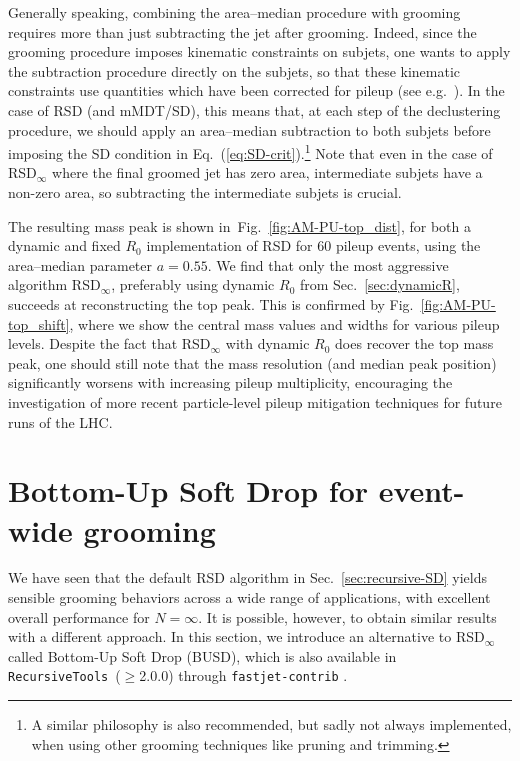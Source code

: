 \documentclass[11pt,a4paper]{article}
\DeclareRobustCommand{\Sec}[1]{Sec.~\ref{#1}}
\DeclareRobustCommand{\Fig}[1]{Fig.~\ref{#1}}
\DeclareRobustCommand{\Eq}[1]{Eq.~(\ref{#1})}
\begin{document}
Generally speaking, combining the area--median procedure with grooming
requires more than just subtracting the jet after grooming.
%
Indeed, since the grooming procedure imposes kinematic constraints on
subjets, one wants to apply the subtraction procedure directly on the
subjets, so that these kinematic constraints use quantities which have
been corrected for pileup (see e.g.~\cite{Altheimer:2013yza}).
%
In the case of RSD (and mMDT/SD), this means that, at each step
of the declustering procedure, we should apply an area--median
subtraction to both subjets before imposing the SD condition in
\Eq{eq:SD-crit}.\footnote{A similar philosophy is also recommended, but sadly not always implemented, when using other grooming techniques like pruning and trimming.}
%
Note that even in the case of RSD$_\infty$ where the final groomed jet
has zero area, intermediate subjets have a non-zero area, so
subtracting the intermediate subjets is crucial. 



The resulting mass peak is shown in~\Fig{fig:AM-PU-top_dist}, for
both a dynamic and fixed $R_0$ implementation of RSD for 60 pileup
events, using the area--median parameter $a=0.55$.
%
We find that only the
most aggressive algorithm RSD$_\infty$, preferably using dynamic
$R_0$ from \Sec{sec:dynamicR}, succeeds at reconstructing
the top peak.
%
This is confirmed by \Fig{fig:AM-PU-top_shift}, where we
show the central mass values and widths for various pileup levels.
%
Despite the fact that RSD$_\infty$ with dynamic $R_0$ does recover the top mass peak, one
should still note that the mass resolution (and median peak position)
significantly worsens with increasing pileup multiplicity, encouraging
the investigation of more recent particle-level pileup mitigation techniques for
future runs of the LHC.


\section{Bottom-Up Soft Drop for event-wide grooming}
\label{sec:BUSD}

We have seen that the default RSD algorithm in \Sec{sec:recursive-SD} yields sensible
grooming behaviors across a wide range of applications, with excellent overall performance for $N = \infty$.
%
It is possible, however, to obtain similar results with a different
approach.
%
In this section, we introduce an alternative to RSD$_\infty$ called Bottom-Up Soft Drop (BUSD), which is also available in {\tt{RecursiveTools}}~($\ge$2.0.0) through \texttt{fastjet-contrib} \cite{fjcontrib}.
\end{document}
